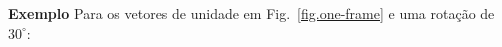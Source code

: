 \noindent\textbf{Exemplo} Para os vetores de unidade em Fig.~\ref{fig.one-frame} e uma rotação de $30^\circ$:
